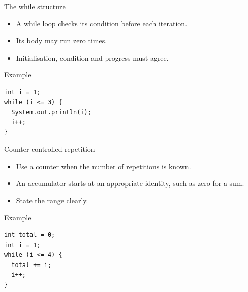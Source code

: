 \documentclass[10pt,aspectratio=169]{beamer}
\begin{document}
\begin{frame}[fragile,t]{The while structure}
\begin{itemize}
\item A while loop checks its condition before each iteration.
\item Its body may run zero times.
\item Initialisation, condition and progress must agree.
\end{itemize}
\vspace{1mm}\begin{block}{Example}
\begin{lstlisting}
int i = 1;
while (i <= 3) {
  System.out.println(i);
  i++;
}
\end{lstlisting}
\end{block}
\end{frame}

\begin{frame}[fragile,t]{Counter-controlled repetition}
\begin{itemize}
\item Use a counter when the number of repetitions is known.
\item An accumulator starts at an appropriate identity, such as zero for a sum.
\item State the range clearly.
\end{itemize}
\vspace{1mm}\begin{block}{Example}
\begin{lstlisting}
int total = 0;
int i = 1;
while (i <= 4) {
  total += i;
  i++;
}
\end{lstlisting}
\end{block}
\end{frame}
\end{document}
